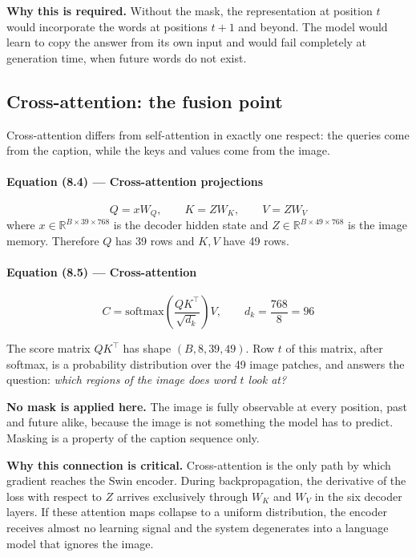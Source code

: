 \documentclass[12pt]{article}
\begin{document}
\textbf{Why this is required.} Without the mask, the representation at position $t$ would incorporate the words at positions $t+1$ and beyond. The model would learn to copy the answer from its own input and would fail completely at generation time, when future words do not exist.

\subsection{Cross-attention: the fusion point}

Cross-attention differs from self-attention in exactly one respect: the queries come from the caption, while the keys and values come from the image.

\paragraph{Equation (8.4) --- Cross-attention projections}
\begin{equation}
Q = xW_Q, \qquad K = ZW_K, \qquad V = ZW_V
\end{equation}
where $x \in \mathbb{R}^{B\times39\times768}$ is the decoder hidden state and $Z \in \mathbb{R}^{B\times49\times768}$ is the image memory. Therefore $Q$ has 39 rows and $K, V$ have 49 rows.

\paragraph{Equation (8.5) --- Cross-attention}
\begin{equation}
C = \mathrm{softmax}\!\left(\frac{QK^\top}{\sqrt{d_k}}\right)V, \qquad d_k = \frac{768}{8} = 96
\end{equation}

The score matrix $QK^\top$ has shape $(B, 8, 39, 49)$. Row $t$ of this matrix, after softmax, is a probability distribution over the 49 image patches, and answers the question: \emph{which regions of the image does word $t$ look at?}

\textbf{No mask is applied here.} The image is fully observable at every position, past and future alike, because the image is not something the model has to predict. Masking is a property of the caption sequence only.

\textbf{Why this connection is critical.} Cross-attention is the only path by which gradient reaches the Swin encoder. During backpropagation, the derivative of the loss with respect to $Z$ arrives exclusively through $W_K$ and $W_V$ in the six decoder layers. If these attention maps collapse to a uniform distribution, the encoder receives almost no learning signal and the system degenerates into a language model that ignores the image.
\end{document}
